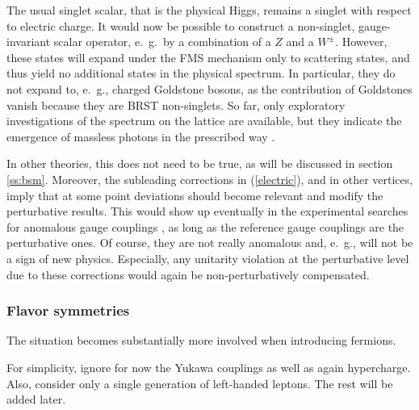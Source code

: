 \documentclass[final,12pt,3p,longtitle]{elsarticle}
\newcommand*{\pref}[1]{(\ref{#1})}
\newcommand*{\1}{1\!\!\!\bot}
\begin{document}
The usual singlet scalar, that is the physical Higgs, remains a singlet with respect to electric charge. It would now be possible to construct a non-singlet, gauge-invariant scalar operator, e.\ g.\ by a combination of a $Z$ and a $W^\pm$. However, these states will expand under the FMS mechanism only to scattering states, and thus yield no additional states in the physical spectrum. In particular, they do not expand to, e.\ g., charged Goldstone bosons, as the contribution of Goldstones vanish because they are BRST non-singlets. So far, only exploratory investigations of the spectrum on the lattice are available, but they indicate the emergence of massless photons in the prescribed way \cite{Shrock:1985ur,Shrock:1985un,Lee:1985yi}.

In other theories, this does not need to be true, as will be discussed in section \ref{ss:bsm}. Moreover, the subleading corrections in \pref{electric}, and in other vertices, imply that at some point deviations should become relevant and modify the perturbative results. This would show up eventually in the experimental searches for anomalous gauge couplings \cite{Gounaris:1996rz,Baak:2013fwa}, as long as the reference gauge couplings are the perturbative ones. Of course, they are not really anomalous and, e.\ g., will not be a sign of new physics. Especially, any unitarity violation at the perturbative level due to these corrections \cite{Bohm:2001yx} would again be non-perturbatively compensated.

\subsubsection{Flavor symmetries}\label{ss:flavor}

The situation becomes substantially more involved when introducing fermions.

For simplicity, ignore for now the Yukawa couplings as well as again hypercharge. Also, consider only a single generation of left-handed leptons. The rest will be added later.
\end{document}
